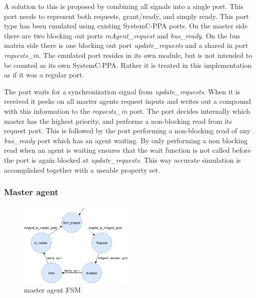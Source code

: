 A solution to this is proposed by combining all signals into a single port. This port needs to represent both requests, grant/ready, and simply ready.
This port type has been emulated using existing SystemC-PPA ports. On the master side there are two blocking out ports \textit{mAgent\_request} and \textit{bus\_ready}. On the bus matrix side there is one blocking out port \textit{update\_requests} and a shared in port \textit{requests\_in}. The emulated
port resides in its own module, but is not intended to be counted as its own SystemC-PPA. Rather it is treated in this implementation as if it was a regular
port. \par
The port waits for a synchronization signal from \textit{update\_requests}. When it is received it peeks on all master agents request inputs and writes out a compound with this information to the \textit{requests\_in} port. The port decides internally which master has the highest priority, and performs a non-blocking read from its request port. This is followed by the port performing a non-blocking read of any \textit{bus\_ready} port which has an agent waiting. 
By only performing a non blocking read when an agent is waiting ensures that the wait function is not called before the port is again blocked at \textit{update\_requests}. This way accurate simulation is accomplished together with a useable property set. \par

\subsubsection{Master agent}
\begin{figure}
\includegraphics[width=5.5cm]{figs/ESL/mAgent_ESL.png}
\caption{master agent FSM}\label{fig:eafsm}
\end{figure}

